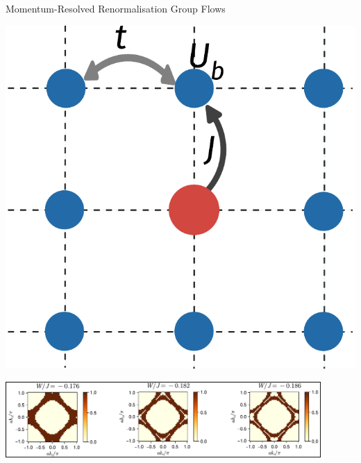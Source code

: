 \documentclass[12pt,aspectratio=169]{beamer}
\begin{document}
\begin{frame}{Momentum-Resolved Renormalisation Group Flows}
\begin{minipage}{0.25\textwidth}
	\includegraphics[width=\textwidth]{pWaveEsiam.pdf}
\end{minipage}

\vspace*{\fill}
\includegraphics[width=0.9\textwidth]{scattProb.pdf}
	
\end{frame}
\end{document}
